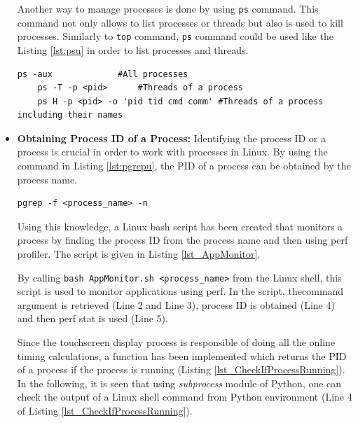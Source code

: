 \begin{itemize}
	Another way to manage processes is done by using \texttt{ps} command. This command not only allows to list processes or threads but also is used to kill processes. Similarly to \texttt{top} command, \texttt{ps} command could be used like the Listing \ref{lst:psu} in order to list processes and threads.
	\begin{lstlisting}[caption={Using ps in Linux shell},label={lst:psu},style=bash]
	ps -aux             #All processes
	ps -T -p <pid>      #Threads of a process
	ps H -p <pid> -o 'pid tid cmd comm' #Threads of a process including their names
	\end{lstlisting}
	
	\item \textbf{Obtaining Process ID of a Process:} Identifying the process ID or a process is crucial in order to work with processes in Linux. By using the command in Listing \ref{lst:pgrepu}, the PID of a process can be obtained by the process name.
	\begin{lstlisting}[caption={Using pgrep},label={lst:pgrepu},style=bash]
		pgrep -f <process_name> -n 
	\end{lstlisting}
	Using this knowledge, a Linux bash script has been created that monitors a process by finding the process ID from the process name and then using perf profiler. The script is given in Listing \ref{lst_AppMonitor}.
	\newpage
	
	
	By calling \texttt{bash AppMonitor.sh <process\texttt{\_}name>} from the Linux shell, this script is used to monitor applications using perf. In the script, thecommand argument is retrieved (Line 2 and Line 3), process ID is obtained (Line 4) and then perf stat is used (Line 5). 
	
	
	Since the touchscreen display process is responsible of doing all the online timing calculations, a function has been implemented which returns the PID of a process if the process is running (Listing \ref{lst_CheckIfProcessRunning}). In the following, it is seen that using \textit{subprocess} module of Python, one can check the output of a Linux shell command from Python environment (Line 4 of Listing \ref{lst_CheckIfProcessRunning}).
	

\end{itemize}
